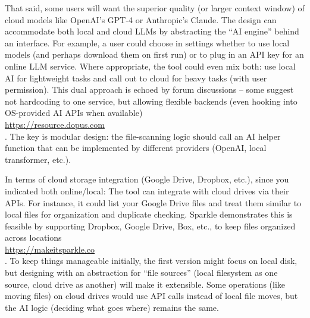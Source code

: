 \documentclass[11pt]{article}
\begin{document}
That said, some users will want the superior quality (or larger context window) of cloud models like OpenAI’s GPT-4 or Anthropic’s Claude. The design can accommodate both local and cloud LLMs by abstracting the “AI engine” behind an interface. For example, a user could choose in settings whether to use local models (and perhaps download them on first run) or to plug in an API key for an online LLM service. Where appropriate, the tool could even mix both: use local AI for lightweight tasks and call out to cloud for heavy tasks (with user permission). This dual approach is echoed by forum discussions -- some suggest not hardcoding to one service, but allowing flexible backends (even hooking into OS-provided AI APIs when available) \\ \url{https://resource.dopus.com} \\ . The key is modular design: the file-scanning logic should call an AI helper function that can be implemented by different providers (OpenAI, local transformer, etc.).

In terms of cloud storage integration (Google Drive, Dropbox, etc.), since you indicated both online/local: The tool can integrate with cloud drives via their APIs. For instance, it could list your Google Drive files and treat them similar to local files for organization and duplicate checking. Sparkle demonstrates this is feasible by supporting Dropbox, Google Drive, Box, etc., to keep files organized across locations \\ \url{https://makeitsparkle.co} \\ . To keep things manageable initially, the first version might focus on local disk, but designing with an abstraction for “file sources” (local filesystem as one source, cloud drive as another) will make it extensible. Some operations (like moving files) on cloud drives would use API calls instead of local file moves, but the AI logic (deciding what goes where) remains the same.
\end{document}
